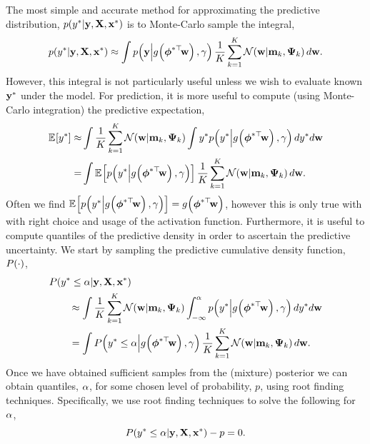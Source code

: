 \documentclass[11pt, oneside]{article}
\begin{document}
The most simple and accurate method for approximating the predictive
distribution, $p\!\left({y^{*}}\middle\vert{\ensuremath{\mathbf{y}}, \ensuremath{\mathbf{X}}, \ensuremath{\mathbf{x}}\ensuremath{^{*}}}\right)$ is to Monte-Carlo
sample the integral,
\begin{equation}
    p\!\left({y^{*}}\middle\vert{\ensuremath{\mathbf{y}}, \ensuremath{\mathbf{X}}, \ensuremath{\mathbf{x}}\ensuremath{^{*}}}\right) \approx
    \int p\!\left({\mathbf{y}}\middle\vert{\ensuremath{{g}_{}\!\left({{\boldsymbol\phi^{*\top}\!\mathbf{w}}}\right)}, \ensuremath{\gamma}}\right)
    \frac{1}{K} \sum^K_{k=1} \mathcal{N}\!\left({\mathbf{w}}\middle\vert{\ensuremath{\mathbf{m}}_k, \ensuremath{\boldsymbol{\Psi}}_k}\right) d \mathbf{w}.
    \label{eq:glppred}
\end{equation}
However, this integral is not particularly useful unless we wish to evaluate
known $\mathbf{y}^{*}$ under the model. For prediction, it is more useful to
compute (using Monte-Carlo integration) the predictive expectation, 
\begin{align}
    \expece{}{\targs\test} \approx&
    \int \frac{1}{K} \sum^K_{k=1} \gausC{\weights}{\pomean_k, \dpocov_k}
    \int \targs\test \probC{\targs\test}{\activ{\feats\testT\weights}, \lparam}
    d \targs\test d \weights
    \nonumber\\
    =& \int \expece{}{\probC{\targs\test}
        {\activ{\feats\testT\weights}, \lparam}}
    \frac{1}{K} \sum^K_{k=1} \gausC{\weights}{\pomean_k, \dpocov_k}
    d \weights.
    \label{eq:glmexpec}
\end{align}
Often we find $\mathbb{E}_{}\!\left[{p\!\left({y^{*}}\middle\vert{\ensuremath{{g}_{}\!\left({{\boldsymbol\phi^{*\top}\!\mathbf{w}}}\right)},
        \ensuremath{\gamma}}\right)}\right] = {g}_{}\!\left({{\boldsymbol\phi^{*\top}\!\mathbf{w}}}\right)$, however this is only true
with with right choice and usage of the activation function. Furthermore, it is
useful to compute quantiles of the predictive density in order to ascertain the
predictive uncertainty. We start by sampling the predictive cumulative density
function, $P\!\left({\cdot}\right)$,
\begin{align}
    &\ProbC{\targs\test \leq \cdfAlph}{\targ, \ins, \inss\test} \nonumber\\ 
    &\qquad\approx \int 
    \frac{1}{K} \sum^K_{k=1} \gausC{\weights}{\pomean_k, \dpocov_k}
    \int^{\cdfAlph}_{-\infty} 
    \probC{\targs\test}{\activ{\feats\testT\weights}, \lparam}
    d \targs\test d \weights \nonumber\\
    &\qquad= \int
    \ProbC{\targs\test \leq \cdfAlph}{\activ{\feats\testT\weights}, \lparam}
    \frac{1}{K} \sum^K_{k=1} \gausC{\weights}{\pomean_k, \dpocov_k}
    d \weights.
    \label{eq:lapexpec}
\end{align}
Once we have obtained sufficient samples from the (mixture) posterior we can
obtain quantiles, $\alpha$, for some chosen level of probability, $p$, using
root finding techniques. Specifically, we use root finding techniques to solve
the following for $\alpha$,
\begin{equation}
    P\!\left({y^{*} \leq \alpha}\middle\vert{\ensuremath{\mathbf{y}}, \ensuremath{\mathbf{X}}, \ensuremath{\mathbf{x}}\ensuremath{^{*}}}\right) - p = 0.
\end{equation}
\end{document}
